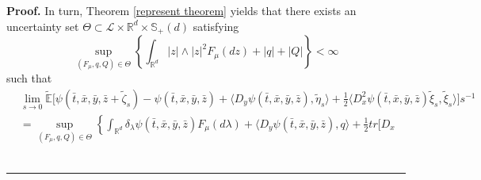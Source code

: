 \documentclass[a4paper,oneside,10pt]{article}%
\newenvironment{proof}[1][Proof]{\noindent \textbf{#1.} }{\  \rule{0.5em}{0.5em}}
\numberwithin{equation}{section}
\begin{document}
\begin{proof}
In turn, Theorem \ref{represent theorem} yields that there exists an
uncertainty set $\Theta \subset \mathcal{L}\times \mathbb{R}^{d}\times
\mathbb{S}_{+}(d)$ satisfying
\[
\sup_{(F_{\mu},q,Q)\in \Theta}\left \{  \int_{\mathbb{R}^{d}}|z|\wedge
|z|^{2}F_{\mu}(dz)+|q|+|Q|\right \}  <\infty
\]
such that
\begin{align}
&  \lim_{s\rightarrow0}\mathbb{\tilde{E}}\big[\psi(\bar{t},\bar{x},\bar
{y},\bar{z} +\tilde{\zeta}_{s})-\psi(\bar{t},\bar{x},\bar{y},\bar{z})+\langle
D_{y}\psi( \bar{t},\bar{x},\bar{y},\bar{z}),\tilde{\eta}_{s}\rangle+\frac{1}{
2}\langle D_{x}^{2}\psi(\bar{t},\bar{x},\bar{y},\bar{z})\tilde{\xi}_{s},
\tilde{\xi} _{s}\rangle \big]s^{-1}\label{1.5}\\
&  =\sup_{(F_{\mu},q,Q)\in \Theta}\left \{  \int_{\mathbb{R}^{d}}\delta
_{\lambda}\psi(\bar{t},\bar{x},\bar{y},\bar{z})F_{\mu}(d\lambda)+\langle
D_{y}\psi(\bar{t},\bar{x},\bar{y},\bar{z}),q\rangle+\frac{1}{2} tr[D_{x}%

\end{align}
\end{proof}
\end{document}
